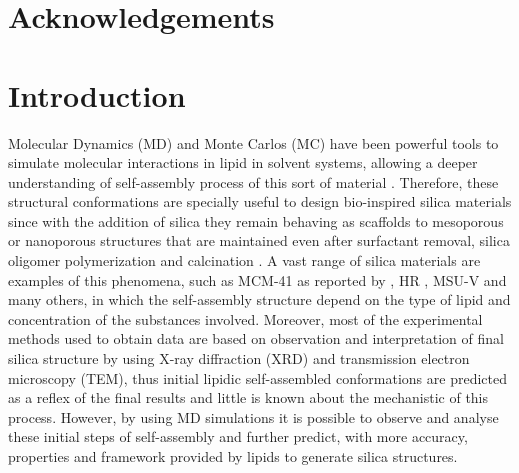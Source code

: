 \documentclass[10pt,a4paper,twoside]{article}
\begin{document}
\vfill
\newpage

\setcounter{tocdepth}{3}
\tableofcontents



\vfill
\newpage

\section{Acknowledgements}

\vfill
\newpage

\section{Introduction}
Molecular Dynamics (MD) and Monte Carlos (MC) have been powerful tools to simulate molecular interactions in lipid in solvent systems, allowing a deeper understanding of self-assembly process of this sort of material \cite{someone}. Therefore, these structural conformations are specially useful to design bio-inspired silica materials \cite{bioinsp} since with the addition of silica they remain behaving as scaffolds to mesoporous or nanoporous structures that are maintained even after surfactant removal, silica oligomer polymerization and calcination \cite{silica1}.
A vast range of silica materials are examples of this phenomena, such as MCM-41 as reported by , HR \cite{hrib}, MSU-V \cite{msuv} and many others, in which the self-assembly structure depend on the type of lipid and concentration of the substances involved. Moreover, most of the experimental methods used to obtain data are based on observation and interpretation of final silica structure by using X-ray diffraction (XRD) and transmission electron microscopy (TEM), thus initial lipidic self-assembled conformations are predicted as a reflex of the final results and little is known about the mechanistic of this process. However, by using MD simulations it is possible to observe and analyse these initial steps of self-assembly and further predict, with more accuracy, properties and framework provided by lipids \cite{lipid} to generate silica structures.
\end{document}
